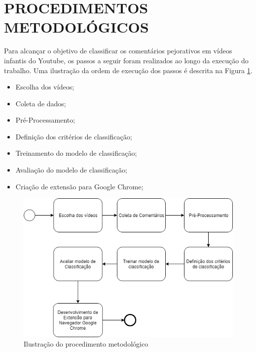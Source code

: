 \newpage
\section{PROCEDIMENTOS METODOLÓGICOS}

Para alcançar o objetivo de classificar os comentários pejorativos em vídeos infantis do Youtube, os passos a seguir foram realizados ao longo da execução do trabalho.
Uma ilustração da ordem de execução dos passos é descrita na Figura \ref{fig:metodologia}.

\begin{itemize}
    \item Escolha dos vídeos;
    \item Coleta de dados;
    \item Pré-Processamento;
    \item Definição dos critérios de classificação;
    \item Treinamento do modelo de classificação;
    \item Avaliação do modelo de classificação;
    \item Criação de extensão para Google Chrome;
    
\end{itemize}

\begin{figure}[H] %
	\caption{\label{fig:metodologia} Ilustração do procedimento metodológico}
	\begin{center}
	    \includegraphics[scale=0.7]{figuras/figura_6.png} %
	\end{center}
\end{figure}


